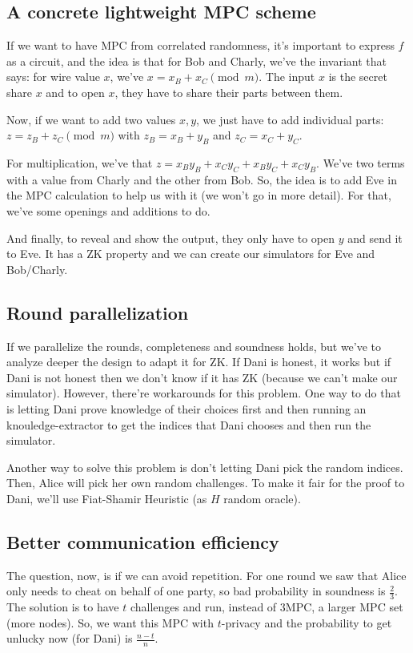   \subsection{A concrete lightweight MPC scheme}
  If we want to have MPC from correlated randomness, it's important to
  express $f$ as a circuit, and the idea is that for Bob and Charly, we've the 
  invariant that says: for wire value $x$, we've $x = x_B + x_C \pmod{m}$.
  The input $x$ is the secret share $x$ and to open $x$, they have to share their parts between them.

  Now, if we want to add two values $x,y$, we just have to add individual parts:
  $z = z_B + z_C \pmod{m}$ with $z_B = x_B + y_B$ and $z_C = x_C + y_C$.

  For multiplication, we've that $z = x_By_B + x_Cy_C + x_By_C + x_Cy_B$.
  We've two terms with a value from Charly and the other from Bob.
  So, the idea is to add Eve in the MPC calculation to help us with it (we won't 
  go in more detail).
  For that, we've some openings and additions to do.

  And finally, to reveal and show the output, they only have to open $y$ and send it to Eve.
  It has a ZK property and we can create our simulators for Eve and Bob/Charly.

  \subsection{Round parallelization}
  If we parallelize the rounds, completeness and soundness holds, but we've to analyze 
  deeper the design to adapt it for ZK.
  If Dani is honest, it works but if Dani is not honest then we don't know if
  it has ZK (because we can't make our simulator).
  However, there're workarounds for this problem.
  One way to do that is letting Dani prove knowledge of their choices first and then 
  running an knouledge-extractor to get the indices that Dani chooses and then run the simulator.

  Another way to solve this problem is don't letting Dani pick the random indices.
  Then, Alice will pick her own random challenges.
  To make it fair for the proof to Dani, we'll use Fiat-Shamir Heuristic (as $H$ random oracle).
  
  \subsection{Better communication efficiency}
  The question, now, is if we can avoid repetition.
  For one round we saw that Alice only needs to cheat on behalf of one party, so 
  bad probability in soundness is $\frac{2}{3}$.
  The solution is to have $t$ challenges and run, instead of $3$MPC, a larger MPC set (more nodes).
  So, we want this MPC with $t$-privacy and the probability to get unlucky now (for Dani)
  is $\frac{n-t}{n}$.

